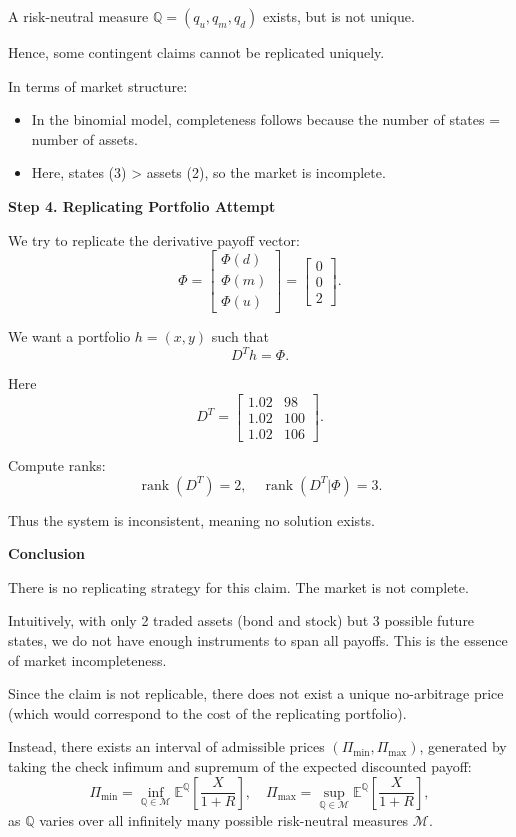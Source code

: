 \documentclass[12pt,a4paper]{article}
\theoremstyle{definition}
\newcommand{\Q}{\mathbb{Q}}
\newcommand{\E}{\mathbb{E}}
\begin{document}
A risk-neutral measure $\Q = (q_u, q_m, q_d)$ exists, but is not unique.

Hence, some contingent claims cannot be replicated uniquely.

In terms of market structure:
\begin{itemize}
\item In the binomial model, completeness follows because the number of states = number of assets.
\item Here, states (3) > assets (2), so the market is incomplete.
\end{itemize}

\textbf{Step 4. Replicating Portfolio Attempt}

We try to replicate the derivative payoff vector:
\[
\Phi = \begin{bmatrix}
\Phi(d) \\
\Phi(m) \\
\Phi(u)
\end{bmatrix} = \begin{bmatrix}
0 \\
0 \\
2
\end{bmatrix}.
\]

We want a portfolio $h = (x,y)$ such that
\[
D^T h = \Phi.
\]

Here
\[
D^T = \begin{bmatrix}
1.02 & 98 \\
1.02 & 100 \\
1.02 & 106
\end{bmatrix}.
\]

Compute ranks:
\[
\operatorname{rank}(D^T) = 2, \quad \operatorname{rank}(D^T|\Phi) = 3.
\]

Thus the system is inconsistent, meaning no solution exists.

\textbf{Conclusion}

There is no replicating strategy for this claim. The market is not complete.

Intuitively, with only 2 traded assets (bond and stock) but 3 possible future states, we do not have enough instruments to span all payoffs. This is the essence of market incompleteness.

Since the claim is not replicable, there does not exist a unique no-arbitrage price (which would correspond to the cost of the replicating portfolio).

Instead, there exists an interval of admissible prices $(\Pi_{\min}, \Pi_{\max})$, generated by taking the check infimum and supremum of the expected discounted payoff:
\[
\Pi_{\min} = \inf_{\Q \in \mathcal{M}} \E^\Q\left[\frac{X}{1+R}\right], \quad \Pi_{\max} = \sup_{\Q \in \mathcal{M}} \E^\Q\left[\frac{X}{1+R}\right],
\]
as $\Q$ varies over all infinitely many possible risk-neutral measures $\mathcal{M}$.
\end{document}

